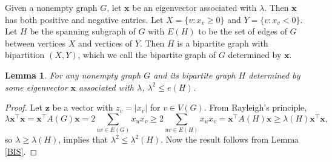 \documentclass[10pt,a4paper]{amsart}
\newtheorem{lemma}{Lemma}[section]
\begin{document}
Given a nonempty graph $G$, let $\mathbf{x}$ be an eigenvector associated with $\lambda$. %
Then $\mathbf{x}$ has both positive and negative entries. Let $X = \{v : x_v \ge 0\}$ and $Y = \{v : x_v < 0\}$. Let $H$ be the spanning subgraph of $G$ with $E(H)$ to be the set of edges of $G$ between vertices $X$ and vertices of $Y$. Then $H$ is a bipartite graph with bipartition $(X, Y)$, which we call the bipartite graph of $G$ determined by $\mathbf{x}$.



\begin{lemma}\label{maxcut}
For any nonempty graph $G$ and its  bipartite graph $H$ determined by some eigenvector  $\mathbf{x}$ associated with $\lambda$, $\lambda^2 \le e(H)$.
\end{lemma}

\begin{proof}
Let $\mathbf{z}$ be a vector with  $z_v = |x_v|$ for $v\in V(G)$. From Rayleigh's principle,
\[
\lambda \mathbf{x}^\top\mathbf{x}=\mathbf{x}^\top A(G)\mathbf{x}=2\sum_{uv\in E(G)}x_ux_v\ge 2\sum_{uv\in E(H)}x_ux_v=\mathbf{x}^\top A(H)\mathbf{x}\ge \lambda(H)\mathbf{x}^\top\mathbf{x},
\]
so $\lambda\ge \lambda(H)$, implies that $\lambda^2\le \lambda^2(H)$. Now the result follows from Lemma \ref{BIS}.
\end{proof}
\end{document}
